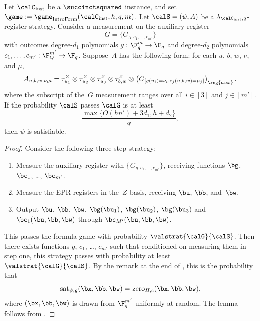 \begin{lemma}\label{lem:polynomial-means-good}
Let $\calC_{\mathrm{inst}}$ be a $\succinctsquared$ instance, and set $\game := \game_{\mathrm{IntroForm}}(\calC_{\mathrm{inst}}, h, q, m)$.
Let $\calS = (\psi, A)$ be a $\lambda_{\calC_{\mathrm{inst}}, q}$-register strategy.
Consider a measurement on the auxiliary register
\begin{equation*}
G = \{G_{g, c_1, \ldots, c_{m'}}\}
\end{equation*}
with outcomes degree-$d_1$ polynomials $g:\F_q^m \rightarrow \F_q$
and degree-$d_2$ polynomials $c_1, \ldots, c_{m'}: \F_Q^{m'} \rightarrow \F_q$.
Suppose~$A$ has the following form: for each $u$, $b$, $w$, $\nu$, and $\mu$,
\begin{equation}\label{eq:weird-form}
A_{u, b, w, \nu, \mu} = \tau^Z_{u_1} \otimes \tau^Z_{u_2} \otimes \tau^Z_{u_3} \otimes \tau^Z_{b, w} \otimes \left(G_{[g(u_i)= \nu_i,  c_j(u, b, w)= \mu_j]}\right)_{\reg{aux}},
\end{equation}
where the subscript of the~$G$ measurement ranges over all $i \in [3]$ and $j \in [m']$.
If the probability $\calS$ passes $\calG$ is at least
\begin{equation*}
\frac{\max\{O(h n') + 3 d_1, h + d_2\}}{q},
\end{equation*}
then $\psi$ is satisfiable.
\end{lemma}
\begin{proof}
Consider the following three step strategy:
\begin{enumerate}
\item Measure the auxiliary register with $\{G_{g, c_1, \ldots, c_{m'}}\}$, receiving functions $\bg$, $\bc_1$, \ldots, $\bc_{m'}$.
\item Measure the EPR registers in the~$Z$ basis, receiving $\bu$, $\bb$, and~$\bw$.
\item Output $\bu$, $\bb$, $\bw$, $\bg(\bu_1)$, $\bg(\bu_2)$, $\bg(\bu_3)$ and $\bc_1(\bu,\bb, \bw)$ through $\bc_{M'}(\bu, \bb, \bw)$.
\end{enumerate}
This passes the formula game with probability $\valstrat{\calG}{\calS}$.
Then there exists functions $g$, $c_1$, \ldots, $c_{m'}$ such that conditioned on measuring them in step one,
this strategy passes with probability at least $\valstrat{\calG}{\calS}$.
By the remark at the end of ,
this is the probability that
\begin{equation*}
\mathrm{sat}_{\psi, g}(\bx, \bb, \bw) = \mathrm{zero}_{H, c}(\bx, \bb, \bw),
\end{equation*}
where $(\bx, \bb, \bw)$ is drawn from $\F_q^{m'}$ uniformly at random.
The lemma follows from .
\end{proof}


